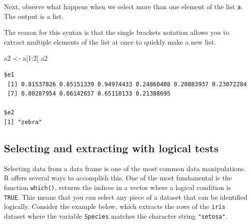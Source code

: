 \documentclass[
  13,
  letterpaper,
]{report}
\newenvironment{Shaded}{\begin{snugshade}}{\end{snugshade}}
\newcommand{\DecValTok}[1]{\textcolor[rgb]{0.68,0.00,0.00}{#1}}
\newcommand{\DocumentationTok}[1]{\textcolor[rgb]{0.37,0.37,0.37}{\textit{#1}}}
\newcommand{\FunctionTok}[1]{\textcolor[rgb]{0.28,0.35,0.67}{#1}}
\newcommand{\NormalTok}[1]{\textcolor[rgb]{0.00,0.23,0.31}{#1}}
\newcommand{\OtherTok}[1]{\textcolor[rgb]{0.00,0.23,0.31}{#1}}
\newcommand{\SpecialCharTok}[1]{\textcolor[rgb]{0.37,0.37,0.37}{#1}}
\begin{document}
Next, observe what happens when we select more than one element of the
list \texttt{a}. The output is a list.

\begin{Shaded}
\end{Shaded}

The reason for this syntax is that the single brackets notation allows
you to extract multiple elements of the list at once to quickly make a
new list.

\begin{Shaded}
\begin{Highlighting}[]
\NormalTok{a2 }\OtherTok{\textless{}{-}}\NormalTok{ a[}\DecValTok{1}\SpecialCharTok{:}\DecValTok{2}\NormalTok{]}
\NormalTok{a2}
\end{Highlighting}
\end{Shaded}

\begin{verbatim}
$e1
 [1] 0.81537826 0.85151339 0.94974433 0.24860408 0.20883937 0.23072284
 [7] 0.80287954 0.06142657 0.65110133 0.21388695

$e2
[1] "zebra"
\end{verbatim}

\subsection{Selecting and extracting with logical
tests}\label{selecting-and-extracting-with-logical-tests}

Selecting data from a data frame is one of the most common data
manipulations. R offers several ways to accomplish this. One of the most
fundamental is the function \texttt{which()}, returns the indices in a
vector where a logical condition is \texttt{TRUE}. This means that you
can select any piece of a dataset that can be identified logically.
Consider the example below, which extracts the rows of the \texttt{iris}
dataset where the variable \texttt{Species} matches the character string
\texttt{"setosa"}.
\end{document}
